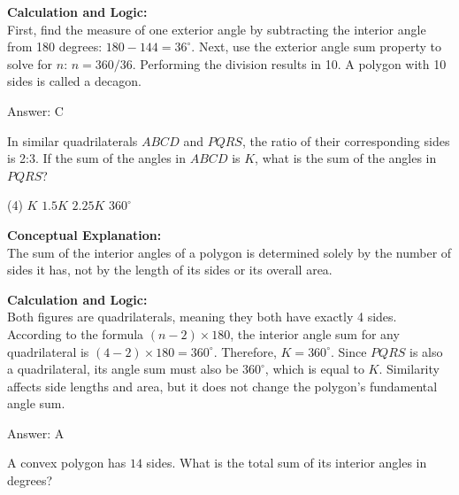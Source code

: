 \documentclass[11pt,paper=a4,answers]{exam}
\begin{document}
\begin{questions}
\begin{solution}
\vspace{30pt}

\textbf{Calculation and Logic:} \\
First, find the measure of one exterior angle by subtracting the interior angle from 180 degrees: $180 - 144 = 36^\circ$. Next, use the exterior angle sum property to solve for $n$: $n = 360 / 36$. Performing the division results in 10. A polygon with 10 sides is called a decagon.

\vspace{30pt}

Answer: \colorbox{yellow!100}{C}
\end{solution}

\vspace{60pt}

\question
In similar quadrilaterals $ABCD$ and $PQRS$, the ratio of their corresponding sides is 2:3. If the sum of the angles in $ABCD$ is $K$, what is the sum of the angles in $PQRS$?
\begin{tasks}(4)
    \task $K$
    \task $1.5K$
    \task $2.25K$
    \task $360^\circ$
\end{tasks}

\begin{solution}
\textbf{Conceptual Explanation:} \\
The sum of the interior angles of a polygon is determined solely by the number of sides it has, not by the length of its sides or its overall area.

\vspace{30pt}

\textbf{Calculation and Logic:} \\
Both figures are quadrilaterals, meaning they both have exactly 4 sides. According to the formula $(n-2) \times 180$, the interior angle sum for any quadrilateral is $(4-2) \times 180 = 360^\circ$. Therefore, $K = 360^\circ$. Since $PQRS$ is also a quadrilateral, its angle sum must also be $360^\circ$, which is equal to $K$. Similarity affects side lengths and area, but it does not change the polygon's fundamental angle sum.

\vspace{30pt}

Answer: \colorbox{yellow!100}{A}
\end{solution}

\vspace{60pt}

\question
A convex polygon has $14$ sides. What is the total sum of its interior angles in degrees?


\end{questions}
\end{document}
